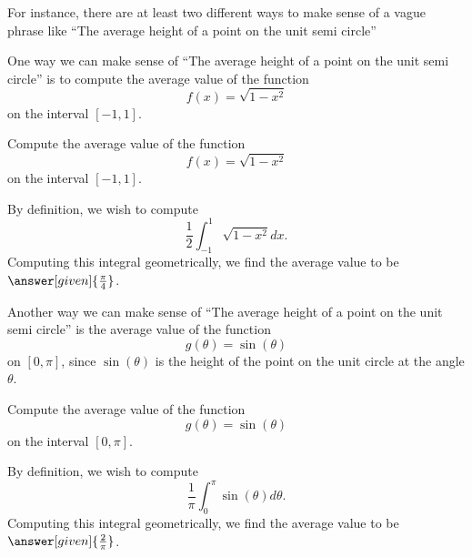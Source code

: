 \documentclass{ximera}
\begin{document}
For instance, there are at least two different ways to make sense of a
vague phrase like ``The average height of a point on the unit semi
circle''
\begin{image}
\end{image}
One way we can make sense of ``The average height of a point on the
unit semi circle'' is to compute the average value of the function
\[
f(x) =\sqrt{1-x^2}
\]
on the interval $[-1,1]$.

\begin{example}
  Compute the average value of the function
  \[
  f(x) =\sqrt{1-x^2}
  \]
  on the interval $[-1,1]$.
  \begin{explanation}
    By definition, we wish to compute
    \[
    \frac{1}{2}\int_{-1}^1 \sqrt{1-x^2}  dx.
    \]
    Computing this integral geometrically, we find the average value
    to be $\answer[given]{\frac{\pi}{4}}$.
  \end{explanation}
\end{example}
Another way we can make sense of ``The average height of a point on the
unit semi circle'' is the average value of the function
\[
g(\theta) =\sin(\theta)
\]
on $[0,\pi]$, since $\sin(\theta)$ is the height of the point on the
unit circle at the angle $\theta$.
\begin{example}
  Compute the average value of the function
  \[
  g(\theta) =\sin(\theta)
  \]
  on the interval $[0,\pi]$.
  \begin{explanation}
    By definition, we wish to compute
    \[
    \frac{1}{\pi} \int_0^\pi\sin(\theta) d\theta.
    \]
    Computing this integral geometrically, we find the average value
    to be $\answer[given]{\frac{2}{\pi}}$.
  \end{explanation}
\end{example}
\end{document}
